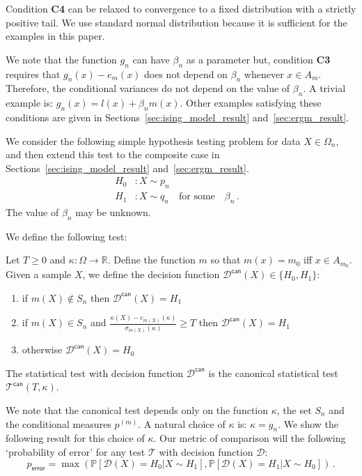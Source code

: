 \documentclass[final,12pt]{colt2018}
\begin{document}
\begin{remark}
 Condition \textbf{C4} can be relaxed to convergence to a fixed distribution with a strictly positive tail. We use standard normal distribution because it is sufficient for the examples in this paper.
\end{remark}
\begin{remark}
We note that the function $g_n$ can have $\beta_n$ as a parameter but, condition \textbf{C3} requires that $g_n(x) - e_m(x)$ does not depend on $\beta_n$ whenever $x \in A_m$. Therefore, the conditional variances do not depend on the value of $\beta_n$. A trivial example is: $g_n(x) = l(x)+ \beta_n m(x)$. Other examples satisfying these conditions are given in Sections~\ref{sec:ising_model_result} and~\ref{sec:ergm_result}.  
\end{remark}

We consider the following simple hypothesis testing problem for data $X \in \Omega_n$, and then extend this test to the composite case in Sections~\ref{sec:ising_model_result} and~\ref{sec:ergm_result}.
\begin{align*}H_0&: X \sim p_n
&\\ H_1&: X \sim q_n\quad \textrm{for some}\quad \beta_n\,.
\end{align*}
 The value of $\beta_n$ may be unknown.  
  
  
  We define the following test:
 \begin{definition}
 \label{def:canonical_test} Let $T \geq 0$ and $\kappa:\Omega \to \mathbb{R}$. Define the function $m$ so that $m(x) = m_0$ iff $x \in A_{m_0}$. 
Given a sample $X$, we define the decision function $\mathcal{D}^{\mathsf{can}}(X) \in \{H_0,H_1\}$:
\begin{enumerate}
\item if $m(X) \notin S_n$ then $\mathcal{D}^{\mathsf{can}}(X) = H_1$
\item if $m(X) \in S_n$ and $\frac{\kappa(X)- e_{m(X)}(\kappa)}{\sigma_{m(X)}(\kappa)} \geq  T$ then $\mathcal{D}^{\mathsf{can}}(X) = H_1$
\item otherwise $\mathcal{D}^{\mathsf{can}}(X) = H_0$
\end{enumerate}
The statistical test with decision function $\mathcal{D}^{\mathsf{can}}$ is the canonical statistical test $\mathcal{T}^{\mathsf{can}}(T,\kappa)$.
\end{definition}
 We note that the canonical test depends only on the function $\kappa$, the set $S_n$ and the conditional measures $p^{(m)}$. A natural choice of $\kappa$ is: $\kappa = g_n$. We show the following result for this choice of $\kappa$. Our metric of comparison will the following `probability of error' for any test $\mathcal{T}$ with decision function $\mathcal{D}$:
$$p_{\mathsf{error}} = \max(\mathbb{P}[\mathcal{D}(X) = H_0| X\sim H_1], \mathbb{P}[\mathcal{D}(X) = H_1| X\sim H_0])\,.$$
\end{document}
